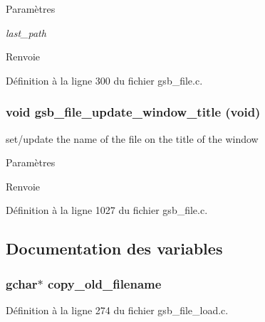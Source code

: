 \begin{DoxyParams}{Paramètres}
\item[{\em last\_\-path}]\end{DoxyParams}
\begin{DoxyReturn}{Renvoie}

\end{DoxyReturn}


Définition à la ligne 300 du fichier gsb\_\-file.c.

\subsubsection[{gsb\_\-file\_\-update\_\-window\_\-title}]{\setlength{\rightskip}{0pt plus 5cm}void gsb\_\-file\_\-update\_\-window\_\-title (void)}\label{gsb__file_8c_a20a017f7b890e6fc0cd7a8c86beeb1dc}
set/update the name of the file on the title of the window


\begin{DoxyParams}{Paramètres}
\item[{\em }]\end{DoxyParams}
\begin{DoxyReturn}{Renvoie}

\end{DoxyReturn}


Définition à la ligne 1027 du fichier gsb\_\-file.c.



\subsection{Documentation des variables}
\subsubsection[{copy\_\-old\_\-filename}]{\setlength{\rightskip}{0pt plus 5cm}gchar$\ast$ {\bf copy\_\-old\_\-filename}}\label{gsb__file_8c_a3799162e8c0ae36914eea47bb3e63020}


Définition à la ligne 274 du fichier gsb\_\-file\_\-load.c.


